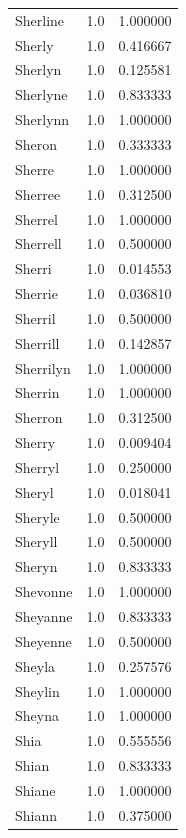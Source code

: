 \documentclass[
  letterpaper,
  DIV=11,
  numbers=noendperiod]{scrreprt}
\begin{document}
\begin{tabular}{lrr}
Sherline        &   1.0 &   1.000000 \\
Sherly          &   1.0 &   0.416667 \\
Sherlyn         &   1.0 &   0.125581 \\
Sherlyne        &   1.0 &   0.833333 \\
Sherlynn        &   1.0 &   1.000000 \\
Sheron          &   1.0 &   0.333333 \\
Sherre          &   1.0 &   1.000000 \\
Sherree         &   1.0 &   0.312500 \\
Sherrel         &   1.0 &   1.000000 \\
Sherrell        &   1.0 &   0.500000 \\
Sherri          &   1.0 &   0.014553 \\
Sherrie         &   1.0 &   0.036810 \\
Sherril         &   1.0 &   0.500000 \\
Sherrill        &   1.0 &   0.142857 \\
Sherrilyn       &   1.0 &   1.000000 \\
Sherrin         &   1.0 &   1.000000 \\
Sherron         &   1.0 &   0.312500 \\
Sherry          &   1.0 &   0.009404 \\
Sherryl         &   1.0 &   0.250000 \\
Sheryl          &   1.0 &   0.018041 \\
Sheryle         &   1.0 &   0.500000 \\
Sheryll         &   1.0 &   0.500000 \\
Sheryn          &   1.0 &   0.833333 \\
Shevonne        &   1.0 &   1.000000 \\
Sheyanne        &   1.0 &   0.833333 \\
Sheyenne        &   1.0 &   0.500000 \\
Sheyla          &   1.0 &   0.257576 \\
Sheylin         &   1.0 &   1.000000 \\
Sheyna          &   1.0 &   1.000000 \\
Shia            &   1.0 &   0.555556 \\
Shian           &   1.0 &   0.833333 \\
Shiane          &   1.0 &   1.000000 \\
Shiann          &   1.0 &   0.375000 \\

\end{tabular}
\end{document}
